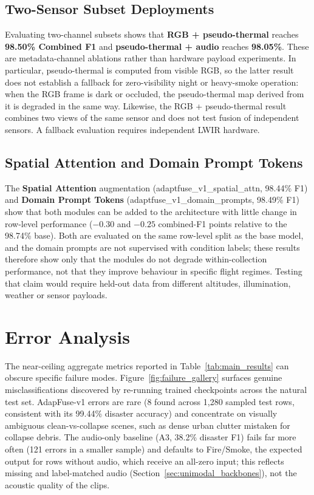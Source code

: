 \subsection{Two-Sensor Subset Deployments}
\label{sec:two_sensor}
Evaluating two-channel subsets shows that \textbf{RGB + pseudo-thermal} reaches \textbf{98.50\% Combined F1} and \textbf{pseudo-thermal + audio} reaches \textbf{98.05\%}. These are metadata-channel ablations rather than hardware payload experiments. In particular, pseudo-thermal is computed from visible RGB, so the latter result does not establish a fallback for zero-visibility night or heavy-smoke operation: when the RGB frame is dark or occluded, the pseudo-thermal map derived from it is degraded in the same way. Likewise, the RGB + pseudo-thermal result combines two views of the same sensor and does not test fusion of independent sensors. A fallback evaluation requires independent LWIR hardware.

\subsection{Spatial Attention and Domain Prompt Tokens}
The \textbf{Spatial Attention} augmentation (adaptfuse\_v1\_spatial\_attn, 98.44\% F1) and \textbf{Domain Prompt Tokens} (adaptfuse\_v1\_domain\_prompts, 98.49\% F1) show that both modules can be added to the architecture with little change in row-level performance ($-0.30$ and $-0.25$ combined-F1 points relative to the 98.74\% base). Both are evaluated on the same row-level split as the base model, and the domain prompts are not supervised with condition labels; these results therefore show only that the modules do not degrade within-collection performance, not that they improve behaviour in specific flight regimes. Testing that claim would require held-out data from different altitudes, illumination, weather or sensor payloads.

\section{Error Analysis}
\label{sec:failure_gallery}

The near-ceiling aggregate metrics reported in Table~\ref{tab:main_results} can obscure specific failure modes. Figure~\ref{fig:failure_gallery} surfaces genuine misclassifications discovered by re-running trained checkpoints across the natural test set. AdapFuse-v1 errors are rare (8 found across 1{,}280 sampled test rows, consistent with its 99.44\% disaster accuracy) and concentrate on visually ambiguous clean-vs-collapse scenes, such as dense urban clutter mistaken for collapse debris. The audio-only baseline (A3, 38.2\% disaster F1) fails far more often (121 errors in a smaller sample) and defaults to Fire/Smoke, the expected output for rows without audio, which receive an all-zero input; this reflects missing and label-matched audio (Section~\ref{sec:unimodal_backbones}), not the acoustic quality of the clips.

